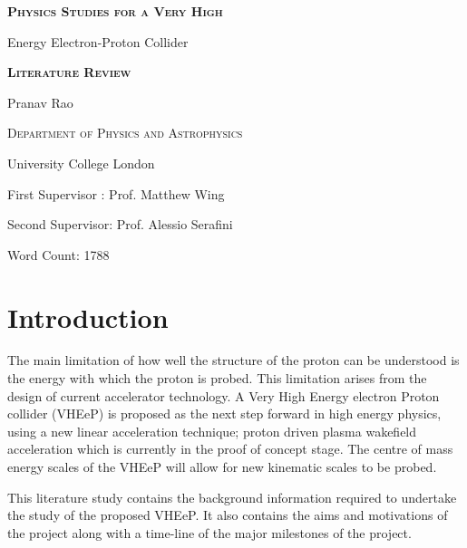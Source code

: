 \documentclass[journal, a4paper,11pt]{IEEEtran}
\begin{document}
\begin{titlepage}
	\centering
    \vspace{2cm}
    {\scshape\LARGE\bfseries Physics Studies for a Very High \par Energy Electron-Proton Collider\par}
    \vspace{2cm}
	{\scshape\Large\bfseries Literature Review\par}
	\vspace{2cm}
	{\Large Pranav Rao\par}
	\vspace{2cm}
	{\scshape\Large Department of Physics and Astrophysics\par University College London\par}
	\vspace{3cm}
	{\huge\bfseries\par}
	{\large First Supervisor : Prof. Matthew Wing\par Second Supervisor: Prof. Alessio Serafini\par}
	\vspace{6cm}
	Word Count: 1788

	\vfill
\end{titlepage}

\justify

\begin{abstract}
This literature study aims to provide context and motivation for the project that is being undertaken. It explores the subjects of deep inelastic scattering, plasma wakefield acceleration and a very high energy electron proton collider. 
\end{abstract}

\section{Introduction}

The main limitation of how well the structure of the proton can be understood is the energy with which the proton is probed. This limitation arises from the design of current accelerator technology. A Very High Energy electron Proton collider (VHEeP) is proposed as the next step forward in high energy physics, using a new linear acceleration technique; proton driven plasma wakefield acceleration which is currently in the proof of concept stage. The centre of mass energy scales of the VHEeP will allow for new kinematic scales to be probed.

This literature study contains the background information required to undertake the study of the proposed VHEeP. It also contains the aims and motivations of the project along with a time-line of the major milestones of the project.
\end{document}
